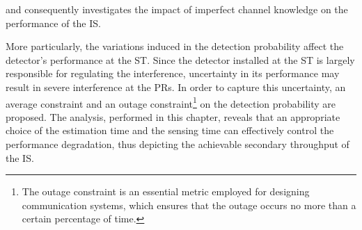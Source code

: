  and consequently investigates the impact of imperfect channel knowledge on the performance of the IS. 

More particularly, the variations induced in the detection probability affect the detector's performance at the ST. Since the detector installed at the ST is largely responsible for regulating the interference, uncertainty in its performance may result in severe interference at the PRs. In order to capture this uncertainty, an average constraint and an outage constraint\footnote{The outage constraint is an essential metric employed for designing communication systems, which ensures that the outage occurs no more than a certain percentage of time.} on the detection probability are proposed.
The analysis, performed in this chapter, reveals that an appropriate choice of the estimation time and the sensing time can effectively control the performance degradation, thus depicting the achievable secondary throughput of the IS.





